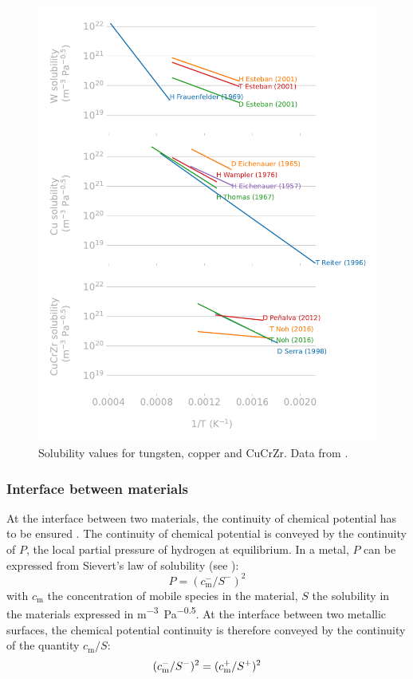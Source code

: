 \begin{figure}
    \centering
    \includegraphics[width=0.8\linewidth]{Figures/Chapter1/materials_solubility_review_comparison.pdf}
    \caption{Solubility values for tungsten, copper and CuCrZr. Data from \cite{delaporte-mathurin_remdelaportemathurinh-transport-materials_2022}.}
\end{figure}

\subsubsection{Interface between materials}
At the interface between two materials, the continuity of chemical potential has to be ensured .
The continuity of chemical potential is conveyed by the continuity of $P$, the local partial pressure of hydrogen at equilibrium.
In a metal, $P$ can be expressed from Sievert's law of solubility (see ):
\begin{equation}
    P = (c_\mathrm{m}^-/S^-)^2
\end{equation}
with $c_\mathrm{m}$ the concentration of mobile species in the material, $S$ the solubility in the materials expressed in \si{m^{-3}.Pa^{-0.5}}.
At the interface between two metallic surfaces, the chemical potential continuity is therefore conveyed by the continuity of the quantity $c_\mathrm{m}/S$:
\begin{equation}
    (c_\mathrm{m}^-/S^-)^2 = (c_\mathrm{m}^+/S^+)^2
    \labeq{c/s conservation}
\end{equation}

